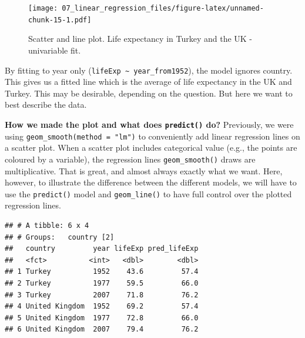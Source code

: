 \documentclass[
  12pt,
  krantz2]{krantz}
\makeatletter
\newenvironment{Shaded}{\begin{snugshade}}{\end{snugshade}}
\newcommand{\DataTypeTok}[1]{\textcolor[rgb]{0.13,0.29,0.53}{#1}}
\newcommand{\DecValTok}[1]{\textcolor[rgb]{0.00,0.00,0.81}{#1}}
\newcommand{\KeywordTok}[1]{\textcolor[rgb]{0.13,0.29,0.53}{\textbf{#1}}}
\newcommand{\NormalTok}[1]{#1}
\newcommand{\OperatorTok}[1]{\textcolor[rgb]{0.81,0.36,0.00}{\textbf{#1}}}
\newcommand{\StringTok}[1]{\textcolor[rgb]{0.31,0.60,0.02}{#1}}
\newenvironment{kframe}{%
\medskip{}
\setlength{\fboxsep}{.8em}
 \def\at@end@of@kframe{}%
 \ifinner\ifhmode%
  \def\at@end@of@kframe{\end{minipage}}%
  \begin{minipage}{\columnwidth}%
 \fi\fi%
 \def\FrameCommand##1{\hskip\@totalleftmargin \hskip-\fboxsep
 \colorbox{shadecolor}{##1}\hskip-\fboxsep
     \hskip-\linewidth \hskip-\@totalleftmargin \hskip\columnwidth}%
 \MakeFramed {\advance\hsize-\width
   \@totalleftmargin\z@ \linewidth\hsize
   \@setminipage}}%
 {\par\unskip\endMakeFramed%
 \at@end@of@kframe}
\renewenvironment{Shaded}{\begin{kframe}}{\end{kframe}}
\makeatother
\begin{document}
\begin{figure}
\centering
\texttt{[image: 07\_linear\_regression\_files/figure-latex/unnamed-chunk-15-1.pdf]}
\caption{\label{fig:unnamed-chunk-15}Scatter and line plot. Life expectancy in Turkey and the UK - univariable fit.}
\end{figure}

By fitting to year only (\texttt{lifeExp\ \textasciitilde{}\ year\_from1952}), the model ignores country.
This gives us a fitted line which is the average of life expectancy in the UK and Turkey.
This may be desirable, depending on the question.
But here we want to best describe the data.

\textbf{How we made the plot and what does \texttt{predict()} do?}
Previously, we were using \texttt{geom\_smooth(method\ =\ "lm")} to conveniently add linear regression lines on a scatter plot.
When a scatter plot includes categorical value (e.g., the points are coloured by a variable), the regression lines \texttt{geom\_smooth()} draws are multiplicative.
That is great, and almost always exactly what we want.
Here, however, to illustrate the difference between the different models, we will have to use the \texttt{predict()} model and \texttt{geom\_line()} to have full control over the plotted regression lines.

\begin{Shaded}
\end{Shaded}

\begin{verbatim}
## # A tibble: 6 x 4
## # Groups:   country [2]
##   country         year lifeExp pred_lifeExp
##   <fct>          <int>   <dbl>        <dbl>
## 1 Turkey          1952    43.6         57.4
## 2 Turkey          1977    59.5         66.0
## 3 Turkey          2007    71.8         76.2
## 4 United Kingdom  1952    69.2         57.4
## 5 United Kingdom  1977    72.8         66.0
## 6 United Kingdom  2007    79.4         76.2
\end{verbatim}
\end{document}
